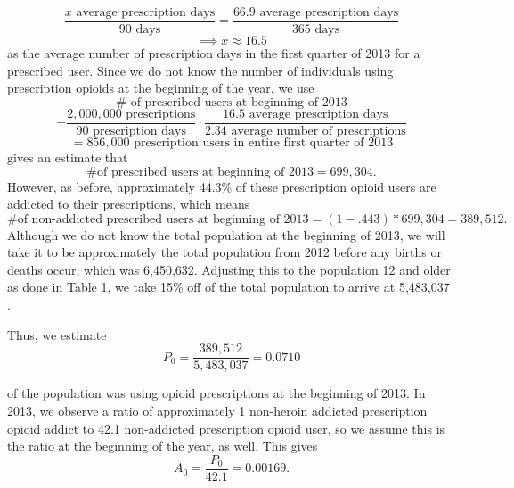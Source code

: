 \documentclass[12pt]{article}
\begin{document}
$$\frac{ x \text{ average prescription days}}{90 \text{ days}}=\frac{66.9 \text{ average prescription days}}{365 \text{ days}}$$
$$\implies x \approx 16.5$$
as the average number of prescription days in the first quarter of 2013 for a prescribed user. 
Since we do not know the number of individuals using prescription opioids at the beginning of the year, we use
$$\# \text{ of prescribed users at beginning of 2013}$$
$$+ \frac{2,000,000 \text{ prescriptions}}{90 \text{ prescription days}} \cdot \frac{16.5 \text{ average prescription days}}{2.34 \text{ average number of prescriptions}}$$
$$= 856,000\text{ prescription users in entire first quarter of 2013}$$
gives an estimate that
$$\text{\# of prescribed users at beginning of 2013}=699,304.$$
However, as before, approximately 44.3\% of these prescription opioid users are addicted to their prescriptions, which means 
$$\text{\# of non-addicted prescribed users at beginning of 2013}=(1-.443)*699,304=389,512.$$
Although we do not know the total population at the beginning of 2013, we will take it to be approximately the total population from 2012 before any births or deaths occur, which was 6,450,632. Adjusting this to the population 12 and older as done in Table 1, we take 15\% off of the total population to arrive at 5,483,037 \cite{USCensus}. 

Thus, we estimate $$P_0=\frac{389,512}{5,483,037}=0.0710$$


of the population was using opioid prescriptions at the beginning of 2013. 
In 2013, we observe a ratio of approximately 1 non-heroin addicted prescription opioid addict to 42.1 non-addicted prescription opioid user, so we assume this is the ratio at the beginning of the year, as well. This gives 
$$A_0=\frac{P_0}{42.1}=0.00169.$$ \\ \\

\end{document}
